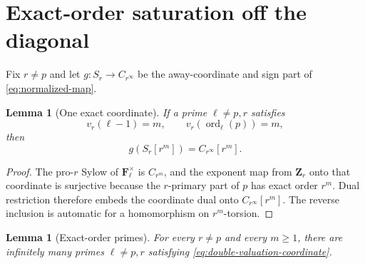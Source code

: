 \documentclass[11pt]{article}
\newtheorem{lemma}[theorem]{Lemma}
\theoremstyle{definition}
\DeclareMathOperator{\ord}{ord}
\begin{document}
\section{Exact-order saturation off the diagonal}\label{sec:saturation}

Fix $r\ne p$ and let $g:S_r\to C_{r^\infty}$ be the away-coordinate and
sign part of \eqref{eq:normalized-map}.

\begin{lemma}[One exact coordinate]\label{lem:one-coordinate}
If a prime $\ell\ne p,r$ satisfies
\begin{equation}\label{eq:double-valuation-coordinate}
v_r(\ell-1)=m,
\qquad
v_r(\ord_\ell(p))=m,
\end{equation}
then
\begin{equation}\label{eq:coordinate-saturation}
g(S_r[r^m])=C_{r^\infty}[r^m].
\end{equation}
\end{lemma}

\begin{proof}
The pro-$r$ Sylow of $\mathbf F_\ell^\times$ is $C_{r^m}$, and the exponent
map from $\mathbf Z_r$ onto that coordinate is surjective because the
$r$-primary part of $p$ has exact order $r^m$.  Dual restriction therefore
embeds the coordinate dual onto $C_{r^\infty}[r^m]$.  The reverse inclusion
is automatic for a homomorphism on $r^m$-torsion.
\end{proof}

\begin{lemma}[Exact-order primes]\label{lem:exact-order-primes}
For every $r\ne p$ and every $m\ge1$, there are infinitely many primes
$\ell\ne p,r$ satisfying \eqref{eq:double-valuation-coordinate}.
\end{lemma}
\end{document}
